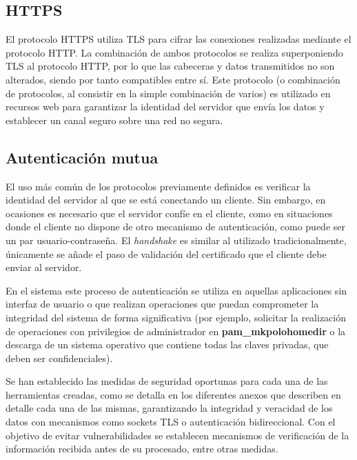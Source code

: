 \subsection{HTTPS}

El protocolo HTTPS\cite{rfc2818} utiliza TLS para cifrar las conexiones realizadas mediante el protocolo HTTP. La combinación de ambos protocolos se realiza superponiendo TLS al protocolo HTTP, por lo que las cabeceras y datos transmitidos no son alterados, siendo por tanto compatibles entre sí. Este protocolo (o combinación de protocolos, al consistir en la simple combinación de varios) es utilizado en recursos web para garantizar la identidad del servidor que envía los datos y establecer un canal seguro sobre una red no segura.

\subsection{Autenticación mutua}
\label{teoria:autenticacionmutua}
El uso más común de los protocolos previamente definidos es verificar la identidad del servidor al que se está conectando un cliente. Sin embargo, en ocasiones es necesario que el servidor confíe en el cliente, como en situaciones donde el cliente no dispone de otro mecanismo de autenticación, como puede ser un par usuario-contraseña. El \textit{handshake} es similar al utilizado tradicionalmente, únicamente se añade el paso de validación del certificado que el cliente debe enviar al servidor.

En el sistema este proceso de autenticación se utiliza en aquellas aplicaciones sin interfaz de usuario o que realizan operaciones que puedan comprometer la integridad del sistema de forma significativa (por ejemplo, solicitar la realización de operaciones con privilegios de administrador en \textbf{pam\_mkpolohomedir} o la descarga de un sistema operativo que contiene todas las claves privadas, que deben ser confidenciales).


Se han establecido las medidas de seguridad oportunas para cada una de las herramientas creadas, como se detalla en los diferentes anexos que describen en detalle cada una de las mismas, garantizando la integridad y veracidad de los datos con mecanismos como sockets TLS o autenticación bidireccional. Con el objetivo de evitar vulnerabilidades se establecen mecanismos de verificación de la información recibida antes de su procesado, entre otras medidas.



